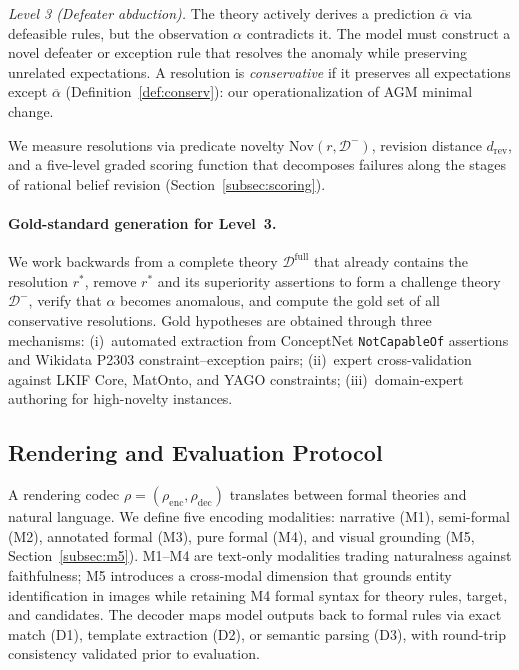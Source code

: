\documentclass{article}
\theoremstyle{definition}
\newcommand{\Dm}{\mathcal{D}^{-}}
\newcommand{\Dfull}{\mathcal{D}^{\mathrm{full}}}
\newcommand{\Nov}{\mathrm{Nov}}
\newcommand{\comp}[1]{\overline{#1}}
\begin{document}
\textit{Level 3 (Defeater abduction).} The theory actively derives a prediction $\comp{\alpha}$ via defeasible rules, but the observation $\alpha$ contradicts it. The model must construct a novel defeater or exception rule that resolves the anomaly while preserving unrelated expectations. A resolution is \textit{conservative} if it preserves all expectations except $\comp{\alpha}$ (Definition~\ref{def:conserv}): our operationalization of AGM minimal change.

We measure resolutions via predicate novelty $\Nov(r, \Dm)$, revision distance $d_{\mathrm{rev}}$, and a five-level graded scoring function that decomposes failures along the stages of rational belief revision (Section~\ref{subsec:scoring}).

\paragraph{Gold-standard generation for Level~3.}
We work backwards from a complete theory $\Dfull$ that already contains the resolution $r^*$, remove $r^*$ and its superiority assertions to form a challenge theory $\Dm$, verify that $\alpha$ becomes anomalous, and compute the gold set of all conservative resolutions. Gold hypotheses are obtained through three mechanisms: (i)~automated extraction from ConceptNet \texttt{NotCapableOf} assertions and Wikidata P2303 constraint--exception pairs; (ii)~expert cross-validation against LKIF Core, MatOnto, and YAGO constraints; (iii)~domain-expert authoring for high-novelty instances.


\subsection{Rendering and Evaluation Protocol}\label{subsec:rendering}

A rendering codec $\rho = (\rho_{\mathrm{enc}}, \rho_{\mathrm{dec}})$ translates between formal theories and natural language. We define five encoding modalities: narrative (M1), semi-formal (M2), annotated formal (M3), pure formal (M4), and visual grounding (M5, Section~\ref{subsec:m5}). M1--M4 are text-only modalities trading naturalness against faithfulness; M5 introduces a cross-modal dimension that grounds entity identification in images while retaining M4 formal syntax for theory rules, target, and candidates. The decoder maps model outputs back to formal rules via exact match (D1), template extraction (D2), or semantic parsing (D3), with round-trip consistency validated prior to evaluation.
\end{document}
